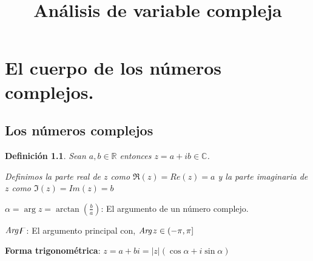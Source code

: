 \documentclass[12pt]{book}
\title{Análisis de variable compleja}
\newtheorem{defi}{Definición}[chapter]
\newcommand{\R}{\mathbb{R}}
\newcommand{\C}{\mathbb{C}}
\newcommand{\Arg}{\emph{Arg}\hspace{0.5mm}}
\begin{document}
\maketitle
\tableofcontents
\begin{comment}
\chapter*{Preámbulo}
\addcontentsline{toc}{chapter}{Preámbulo}
Estos apuntes están destinados a complementar los apuntes tomados por los estudiantes de la asignatura homónima perteneciente al tercer año del Grado en Física de la Universidad de Alicante.
Es un texto realizado fundamentalmente a partir de las notas tomadas durante las lecciones impartidas por el profesor Juan Matías Sepulcre Martínez, del departamento de Análisis Matemático, durante el curso académico 2021-22022, destinado exclusivamente a estudiantes y sin ánimo de lucro.
No está exento de erratas. La edición de estos apuntes se remite a la fecha de compilación que aparece en la portada. El último tema es el que menos horas hemos echado por falta de las mismas. 

Para obtener una copia del código fuente o para comunicar posibles erratas, o colaborar de cualquier forma para mejorar estos apuntes se ruega contactar a: {\color{blue}\href{mailto:orm13@alu.ua.es?subject=Apuntes análisis complejo}{orm13@alu.ua.es}}

\end{comment}
\chapter{El cuerpo de los números complejos.}
\section{Los números complejos}

\begin{defi}
Sean $a,b \in\R$ entonces $z = a + ib \in \C$.

Definimos la parte real de $z$ como $\Re(z) = Re(z) = a$ y la parte imaginaria de $z$ como $\Im(z) = Im(z) = b$
\end{defi}


 $\alpha = \arg z = \arctan(\frac{b}{a})$: El argumento de un número complejo.

 $\mathbb{\Arg z}$: El argumento principal con, $\Arg z \in (-\pi,\pi]$
 
 \textbf{Forma trigonométrica}: $z = a+bi = |z|(\cos \alpha + i\sin \alpha)$
 
\end{document}
